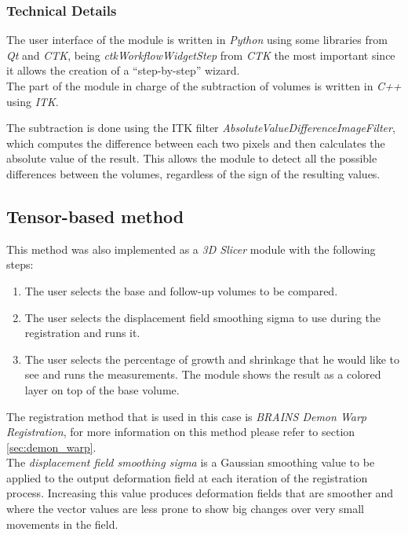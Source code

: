 \subsubsection{Technical Details}
The user interface of the module is written in \textit{Python} using
some libraries from \textit{Qt} and \textit{CTK}, being
\textit{ctkWorkflowWidgetStep} from \textit{CTK} the most important
since it allows the creation of a ``step-by-step'' wizard.\\


The part of the module in charge of the subtraction of volumes is
written in \textit{C++} using \textit{ITK}.

The subtraction is done using the ITK filter
\textit{AbsoluteValueDifferenceImageFilter}, which computes the
difference between each two pixels and then calculates the absolute
value of the result. This allows the module to detect all the possible
differences between the volumes, regardless of the sign of the
resulting values.\\


\subsection{Tensor-based method}
This method was also implemented as a \textit{3D Slicer} module with the following steps:
\begin{enumerate}
\item The user selects the base and follow-up volumes to be compared.
\item The user selects the displacement field smoothing sigma to use during the registration and runs it.
\item The user selects the percentage of growth and shrinkage that he
  would like to see and runs the measurements. The module shows the
  result as a colored layer on top of the base volume.
\end{enumerate}

The registration method that is used in this case is \textit{BRAINS
  Demon Warp Registration}, for more information on this method please
refer to section \ref{sec:demon_warp}.\\

The \textit{displacement field smoothing sigma} is a Gaussian
smoothing value to be applied to the output deformation field at each
iteration of the registration process. Increasing this value produces
deformation fields that are smoother and where the vector values are
less prone to show big changes over very small movements in the field.

